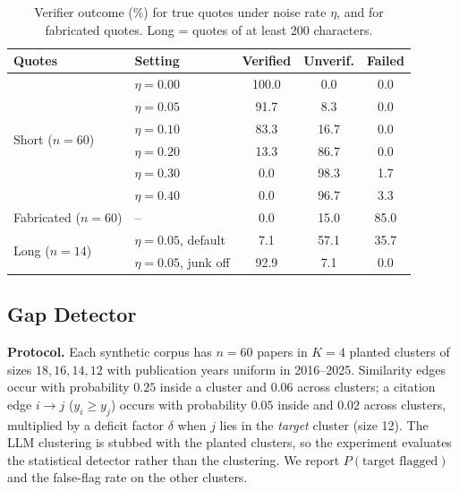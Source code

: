 \documentclass[conference]{IEEEtran}
\begin{document}
\begin{table}[!t]
\caption{Verifier outcome (\%) for true quotes under noise rate $\eta$, and for fabricated quotes. Long = quotes of at least 200 characters.}
\label{tab:ground}
\centering
\footnotesize
\setlength{\tabcolsep}{3.5pt}
\begin{tabular}{@{}llccc@{}}
\toprule
Quotes & Setting & Verified & Unverif. & Failed \\
\midrule
\multirow{6}{*}{Short ($n{=}60$)} & $\eta=0.00$ & 100.0 & 0.0 & 0.0 \\
 & $\eta=0.05$ & 91.7 & 8.3 & 0.0 \\
 & $\eta=0.10$ & 83.3 & 16.7 & 0.0 \\
 & $\eta=0.20$ & 13.3 & 86.7 & 0.0 \\
 & $\eta=0.30$ & 0.0 & 98.3 & 1.7 \\
 & $\eta=0.40$ & 0.0 & 96.7 & 3.3 \\
\midrule
Fabricated ($n{=}60$) & -- & 0.0 & 15.0 & 85.0 \\
\midrule
\multirow{2}{*}{Long ($n{=}14$)} & $\eta=0.05$, default & 7.1 & 57.1 & 35.7 \\
 & $\eta=0.05$, junk off & 92.9 & 7.1 & 0.0 \\
\bottomrule
\end{tabular}
\end{table}

\subsection{Gap Detector}
\textbf{Protocol.} Each synthetic corpus has $n=60$ papers in $K=4$ planted clusters of sizes $18,16,14,12$ with publication years uniform in 2016--2025. Similarity edges occur with probability $0.25$ inside a cluster and $0.06$ across clusters; a citation edge $i\to j$ ($y_i\ge y_j$) occurs with probability $0.05$ inside and $0.02$ across clusters, multiplied by a deficit factor $\delta$ when $j$ lies in the \emph{target} cluster (size 12). The LLM clustering is stubbed with the planted clusters, so the experiment evaluates the statistical detector rather than the clustering. We report $P(\text{target flagged})$ and the false-flag rate on the other clusters.
\end{document}
